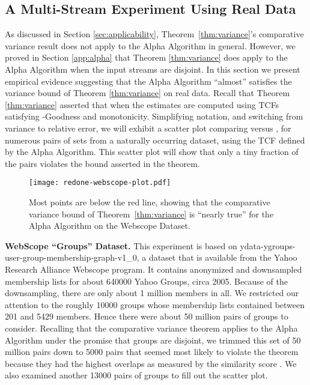 \documentclass{article}
\begin{document}
\subsection{A Multi-Stream Experiment Using Real Data}
\label{sec:webscope-experiment}
\label{app:webscope-experiment}
As discussed in Section \ref{sec:applicability}, Theorem~\ref{thm:variance}'s comparative
variance result does not apply to the Alpha Algorithm in general. However, 
we proved in Section \ref{app:alpha} that Theorem \ref{thm:variance} does apply to the Alpha Algorithm when the
input streams are disjoint. In this section we present empirical
evidence suggesting that the Alpha Algorithm ``almost'' satisfies the variance bound of Theorem \ref{thm:variance} on real
data. Recall that Theorem \ref{thm:variance} asserted that  when the estimates are computed using TCFs satisfying -Goodness and monotonicity. 
Simplifying notation, and switching
from variance to relative error, we will exhibit a scatter plot
comparing  versus ,
for numerous pairs  of sets from a naturally occurring
dataset, using the TCF defined by the Alpha Algorithm. This scatter plot will show that only a tiny fraction of the
pairs violates the bound asserted in the theorem.

\begin{figure}
\begin{center}
\texttt{[image: redone-webscope-plot.pdf]}
\end{center}
\caption{Most points are below the red line, showing that the
comparative variance bound of Theorem~\ref{thm:variance} is ``nearly true'' for the Alpha Algorithm on the Webscope
Dataset.}
\label{fig:webscope-groups-scatter}
\end{figure}

\noindent \textbf{WebScope ``Groups'' Dataset.}
This experiment is based on
ydata-ygroups-user-group-membership-graph-v1\_0, a dataset that is
available from the Yahoo Research Alliance Webscope program.  It
contains anonymized and downsampled membership lists for about 640000
Yahoo Groups, circa 2005. Because of the downsampling, there are only
about 1 million members in all. We restricted our attention to the
roughly 10000 groups whose membership lists contained between 201 and
5429 members. Hence there were about 50 million pairs of groups to
consider.  Recalling that the comparative variance theorem applies to the Alpha Algorithm
under the promise that groups are disjoint, we trimmed this set of 50 million
pairs down to 5000 pairs that seemed most likely to violate the 
theorem because they had the highest overlaps as measured by the similarity score 
.
We also examined another 13000 pairs of groups to fill out the 
scatter plot.                                                                                      
\end{document}
